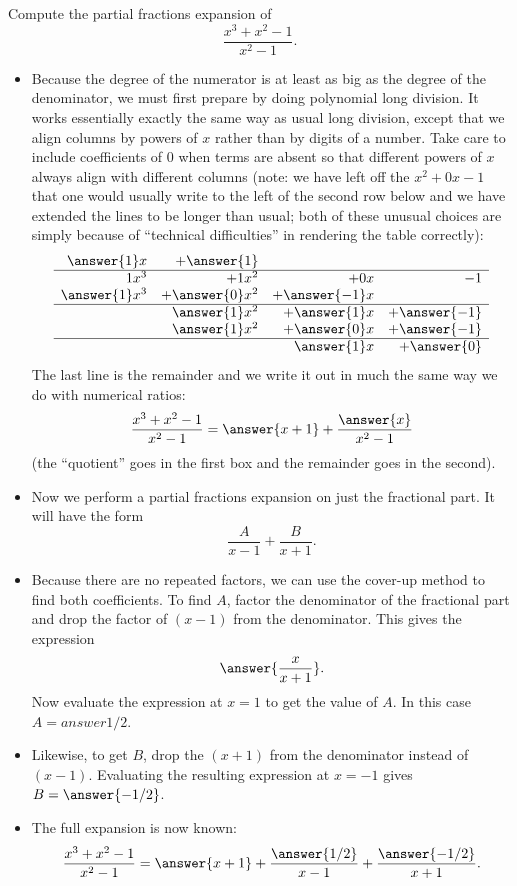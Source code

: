 \documentclass{ximera}
\begin{document}
\begin{example}
Compute the partial fractions expansion of
\[ \frac{x^3 + x^2 -1}{x^2-1}. \]
\begin{itemize}
\item Because the degree of the numerator is at least as big as the degree of the denominator, we must first prepare by doing polynomial long division. It works essentially exactly the same way as usual long division, except that we align columns by powers of $x$ rather than by digits of a number. Take care to include coefficients of $0$ when terms are absent so that different powers of $x$ always align with different columns (note: we have left off the $x^2 + 0 x - 1$ that one would usually write to the left of the second row below and we have extended the lines to be longer than usual; both of these unusual choices are simply because of ``technical difficulties'' in rendering the table correctly):
\[ 
\begin{array}{rrrr}
  \answer{1}x & + \answer{1} & & \\
\hline
 1 x^3 & + 1 x^2 & + 0 x & -1 \\
 \answer{1} x^3 & + \answer{0} x^2 & + \answer{-1} x &  \\
\hline
 & \answer{1} x^2 & + \answer{1} x & + \answer{-1} \\
 & \answer{1} x^2 & + \answer{0} x & + \answer{-1} \\
\hline
 &  & \answer{1} x & + \answer{0}
\end{array}
\]
The last line is the remainder and we write it out in much the same way we do with numerical ratios:
\[ \frac{x^3 + x^2 - 1}{x^2 - 1} = \answer{ x + 1} + \frac{\answer{x}}{x^2-1} \]
(the ``quotient'' goes in the first box and the remainder goes in the second).
\item Now we perform a partial fractions expansion on just the fractional part.  It will have the form
\[ \frac{A}{x-1} + \frac{B}{x+1}. \]
\item Because there are no repeated factors, we can use the cover-up method to find both coefficients.  To find $A$, factor the denominator of the fractional part and drop the factor of $(x-1)$ from the denominator. This gives the expression
\[ \answer{\frac{x}{x+1}}. \]
Now evaluate the expression at $x = 1$ to get the value of $A$. In this case $A = answer{1/2}$.
\item Likewise, to get $B$, drop the $(x+1)$ from the denominator instead of $(x-1)$. Evaluating the resulting expression at $x = -1$ gives $B = \answer{-1/2}$.  
\item The full expansion is now known:
\[ \frac{x^3+x^2-1}{x^2-1} = \answer{x+1} + \frac{\answer{1/2}}{x-1} + \frac{\answer{-1/2}}{x+1}. \]
\end{itemize}
\end{example}
\end{document}
